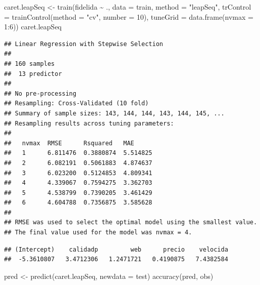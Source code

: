 \documentclass[
]{book}
\newenvironment{Shaded}{\begin{snugshade}}{\end{snugshade}}
\newcommand{\AttributeTok}[1]{\textcolor[rgb]{0.77,0.63,0.00}{#1}}
\newcommand{\CommentTok}[1]{\textcolor[rgb]{0.56,0.35,0.01}{\textit{#1}}}
\newcommand{\DecValTok}[1]{\textcolor[rgb]{0.00,0.00,0.81}{#1}}
\newcommand{\FunctionTok}[1]{\textcolor[rgb]{0.00,0.00,0.00}{#1}}
\newcommand{\NormalTok}[1]{#1}
\newcommand{\OtherTok}[1]{\textcolor[rgb]{0.56,0.35,0.01}{#1}}
\newcommand{\SpecialCharTok}[1]{\textcolor[rgb]{0.00,0.00,0.00}{#1}}
\newcommand{\StringTok}[1]{\textcolor[rgb]{0.31,0.60,0.02}{#1}}
\theoremstyle{break}
\theoremstyle{definition}
\theoremstyle{definition}
\theoremstyle{definition}
\theoremstyle{definition}
\theoremstyle{remark}
\begin{document}
\begin{Shaded}
\begin{Highlighting}[]
\NormalTok{caret.leapSeq }\OtherTok{\textless{}{-}} \FunctionTok{train}\NormalTok{(fidelida }\SpecialCharTok{\textasciitilde{}}\NormalTok{ ., }\AttributeTok{data =}\NormalTok{ train, }\AttributeTok{method =} \StringTok{"leapSeq"}\NormalTok{,}
                   \AttributeTok{trControl =} \FunctionTok{trainControl}\NormalTok{(}\AttributeTok{method =} \StringTok{"cv"}\NormalTok{, }\AttributeTok{number =} \DecValTok{10}\NormalTok{),}
                   \AttributeTok{tuneGrid =} \FunctionTok{data.frame}\NormalTok{(}\AttributeTok{nvmax =} \DecValTok{1}\SpecialCharTok{:}\DecValTok{6}\NormalTok{))}
\NormalTok{caret.leapSeq}
\end{Highlighting}
\end{Shaded}

\begin{verbatim}
## Linear Regression with Stepwise Selection 
## 
## 160 samples
##  13 predictor
## 
## No pre-processing
## Resampling: Cross-Validated (10 fold) 
## Summary of sample sizes: 143, 144, 144, 143, 144, 145, ... 
## Resampling results across tuning parameters:
## 
##   nvmax  RMSE      Rsquared   MAE     
##   1      6.811476  0.3880874  5.514825
##   2      6.082191  0.5061883  4.874637
##   3      6.023200  0.5124853  4.809341
##   4      4.339067  0.7594275  3.362703
##   5      4.538799  0.7390205  3.461429
##   6      4.604788  0.7356875  3.585628
## 
## RMSE was used to select the optimal model using the smallest value.
## The final value used for the model was nvmax = 4.
\end{verbatim}

\begin{Shaded}
\end{Shaded}

\begin{verbatim}
## (Intercept)    calidadp         web      precio    velocida 
##  -5.3610807   3.4712306   1.2471721   0.4190875   7.4382584
\end{verbatim}

\begin{Shaded}
\begin{Highlighting}[]
\NormalTok{pred }\OtherTok{\textless{}{-}} \FunctionTok{predict}\NormalTok{(caret.leapSeq, }\AttributeTok{newdata =}\NormalTok{ test)}
\FunctionTok{accuracy}\NormalTok{(pred, obs)}
\end{Highlighting}
\end{Shaded}
\end{document}
